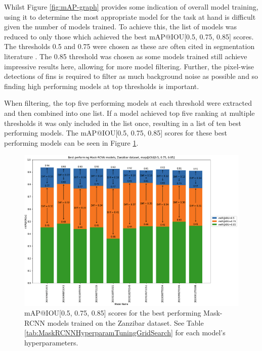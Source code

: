 Whilst Figure \ref{fig:mAP-graph} provides some indication of overall model training, using it to determine the most appropriate model for the task at hand is difficult given the number of models trained. To achieve this, the list of models was reduced to only those which achieved the best mAP@IOU[0.5, 0.75, 0.85] scores. The thresholds 0.5 and 0.75 were chosen as these are often cited in segmentation literature \cite{bolya_190402689_2019, wang_solov2_2020, tian_fcos_2019}. The 0.85 threshold was chosen as some models trained still achieve impressive results here, allowing for more model filtering. Further, the pixel-wise detections of fins is required to filter as much background noise as possible and so finding high performing models at top thresholds is important.

When filtering, the top five performing models at each threshold were extracted and then combined into one list. If a model  achieved top five ranking at multiple thresholds it was only included in the list once, resulting in a list of ten best performing models. The mAP@IOU[0.5, 0.75, 0.85] scores for these best performing models can be seen in Figure \ref{fig:mAP-best-models-bar-chart}.

\begin{figure}[h]
	\begin{center}
		\includegraphics[scale=0.6]{Chapter3/figs/mask-RCNN-model-bar-chart.png}
	\end{center}
	\caption{mAP@IOU[0.5, 0.75, 0.85] scores for the best performing Mask-RCNN models trained on the Zanzibar dataset. See Table \ref{tab:MaskRCNNHyperparamTuningGridSearch} for each model's hyperparameters.}
	\label{fig:mAP-best-models-bar-chart}
\end{figure}

